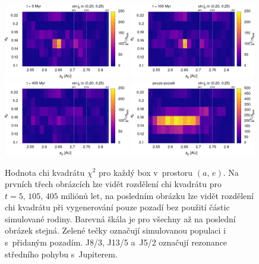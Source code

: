 \documentclass[A4paper, 12pt, oneside]{book}
\begin{document}
\begin{figure}
	\centering
	\includegraphics[width=0.49\textwidth]{obr/ae_chi_0006t.png}
	\includegraphics[width=0.49\textwidth]{obr/ae_chi_0106t.png}\\
	\includegraphics[width=0.49\textwidth]{obr/ae_chi_0406t.png}
	\includegraphics[width=0.49\textwidth]{obr/ae_chi_emptyt.png}
	\caption{Hodnota chi kvadrátu $\chi^2$ pro každý box v~prostoru $(a,\,e)$. Na prvních třech obrázcích lze vidět rozdělení chi kvadrátu pro $t=5,\,105,\,405$ miliónů let, na posledním obrázku lze vidět rozdělení chi kvadrátu při vygenerování pouze pozadí bez použití částic simulované rodiny. Barevná škála je pro všechny až na poslední obrázek stejná. Zelené tečky označují simulovanou populaci i s~přidaným pozadím. J8/3, J13/5 a~J5/2 označují rezonance středního pohybu s~Jupiterem.} \label{fig:ae_chi2}
\end{figure}
\end{document}
